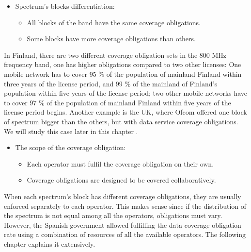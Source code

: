 \begin{itemize}
	\item Spectrum’s blocks differentiation:\par

\begin{itemize}
	\item All blocks of the band have the same coverage obligations.\par

	\item Some blocks have more coverage obligations than others.\par
\end{itemize}
\end{itemize}
In Finland, there are two different coverage obligation sets in the 800 MHz frequency band, one has higher obligations compared to two other licenses: One mobile network has to cover 95 $\%$  of the population of mainland Finland within three years of the license period, and 99 $\%$  of the mainland of Finland's population within five years of the license period; two other mobile networks have to cover 97 $\%$  of the population of mainland Finland within five years of the license period begins.  Another example is the UK, where Ofcom offered one block of spectrum bigger than the others, but with data service coverage obligations. We will study this case later in this chapter \cite{2-09}.\par

\begin{itemize}
	\item The scope of the coverage obligation:\par

\begin{itemize}
	\item Each operator must fulfil the coverage obligation on their own.\par

	\item Coverage obligations are designed to be covered collaboratively.\par
\end{itemize}
\end{itemize}
When each spectrum’s block has different coverage obligations, they are usually enforced separately to each operator. This makes sense since if the distribution of the spectrum is not equal among all the operators, obligations must vary. However, the Spanish government allowed fulfilling the data coverage obligation rate using a combination of resources of all the available operators. The following chapter explains it extensively.\par

